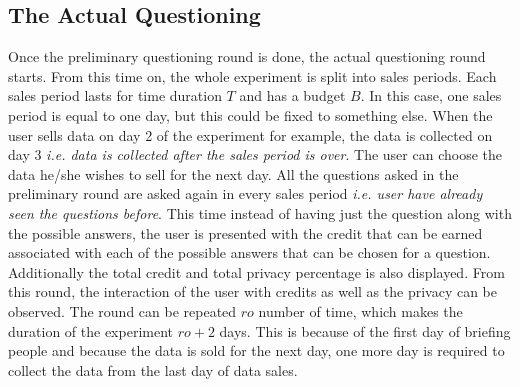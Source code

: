 \subsection{The Actual Questioning}
Once the preliminary questioning round is done, the actual questioning round starts. From this time on, the whole experiment is
split into sales periods. Each sales period lasts for time duration $T$ and has a budget $B$. In this case, one sales period
is equal to one day, but this could be fixed to something else. When the user sells data on day 2 of the experiment for example, the data is collected on day 3 {\it i.e. data is collected after the sales period is over}.
 The user can choose the data he/she
wishes to sell for the next day. All the questions asked in the preliminary round are asked again in every sales period {\it i.e. user have already seen the questions before}. 
This time instead of having just the question along with the possible answers, the user is presented with
the credit that can be earned associated with each of the possible answers that can be chosen for a question. Additionally the total credit and total privacy percentage is also displayed. From this round,
the interaction of the user with credits as well as the privacy can be observed. The round can be repeated $ro$ number of time, which makes the duration of the experiment
$ro + 2$ days. This is because of the first day of briefing people and because the data is sold for the next day, one more day is required to collect the data from
the last day of data sales.

